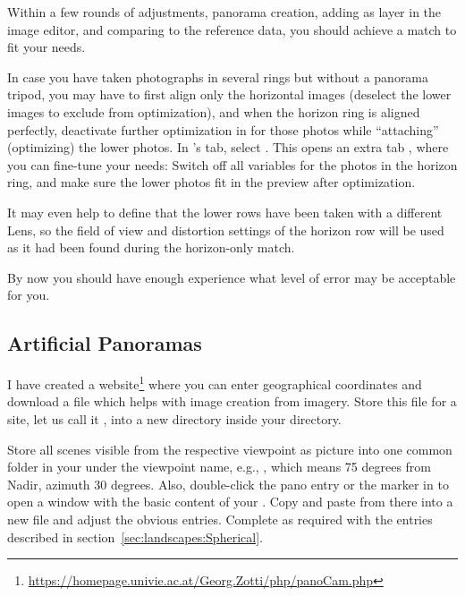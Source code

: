 Within a few rounds of adjustments, panorama creation, adding as layer
in the image editor, and comparing to the reference data, you should
achieve a match to fit your needs.

In case you have taken photographs in several rings but without a panorama tripod, you may have to
first align only the horizontal images (deselect the lower images to
exclude from optimization), and when the horizon ring is aligned
perfectly, deactivate further optimization in  for those photos
while ``attaching'' (optimizing) the lower photos. In 's  tab,
select . This opens an
extra tab , where you can fine-tune your needs: Switch
off all variables for the photos in the horizon ring, and make sure
the lower photos fit in the preview after optimization.

It may even help to define that the lower rows have been taken with a
different Lens, so the field of view and distortion settings of the
horizon row will be used as it had been found during the horizon-only
match.

By now you should have
enough experience what level of error may be acceptable for you.


\subsection{Artificial Panoramas}
\label{sec:landscapes:Artificial}

I have created a
website\footnote{\url{https://homepage.univie.ac.at/Georg.Zotti/php/panoCam.php}} where
you can enter geographical coordinates and download a file
  which helps with image creation from 
imagery. Store this file for a site, let us call it
, into a new directory  inside
your  directory.

Store all scenes visible from the respective viewpoint
 as picture into one common folder in your
 under the viewpoint name, e.g.,
, which means 75 degrees from Nadir, azimuth 30
degrees.  Also, double-click the pano entry or the marker in  to open a window with the
basic content of your . Copy and paste from there
into a new file  and adjust the obvious
entries. Complete as required with the entries described in
section~\ref{sec:landscapes:Spherical}.


